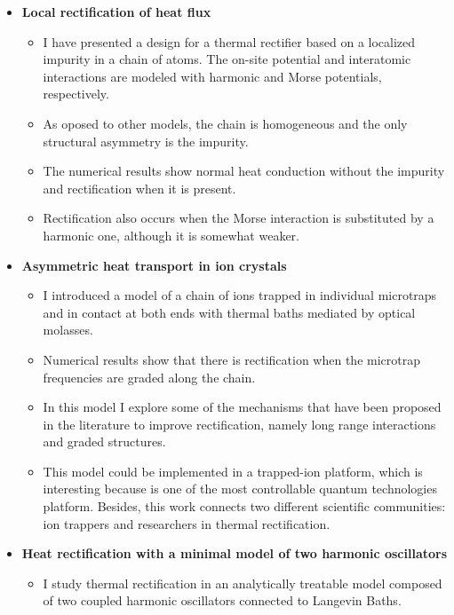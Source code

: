 \begin{itemize}
  \item {\bf Local rectification of heat flux}
  \begin{itemize}
    \item I have presented a design for a thermal rectifier based on a localized impurity in a chain of atoms. The on-site potential and interatomic interactions are modeled with harmonic and Morse potentials, respectively.

    \item As oposed to other models, the chain is homogeneous and the only structural asymmetry is the impurity.

    \item The numerical results show normal heat conduction without the impurity and rectification when it is present.

    \item Rectification also occurs when the Morse interaction is substituted by a harmonic one, although it is somewhat weaker.

  \end{itemize}

  \item {\bf Asymmetric heat transport in ion crystals}
  \begin{itemize}
    \item I introduced a model of a chain of ions trapped in individual microtraps and in contact at both ends with thermal baths mediated by optical molasses.

    \item Numerical results show that there is rectification when the microtrap frequencies are graded along the chain.

    \item In this model I explore some of the mechanisms that have been proposed in the literature to improve rectification, namely long range interactions and graded structures.

    \item This model could be implemented in a trapped-ion platform, which is interesting because is one of the most controllable quantum technologies platform. Besides, this work connects two different scientific communities: ion trappers and researchers in thermal rectification.
  \end{itemize}

  \item {\bf Heat rectification with a minimal model of two harmonic oscillators}
  \begin{itemize}
    \item  I study thermal rectification in an analytically treatable model
    composed of two coupled harmonic oscillators connected to Langevin Baths.


\end{itemize}
\end{itemize}
